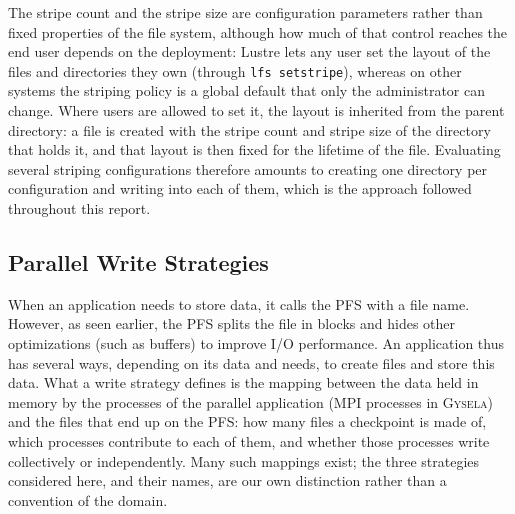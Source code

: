 The stripe count and the stripe size are configuration parameters rather than
fixed properties of the file system, although how much of that control reaches the
end user depends on the deployment: Lustre lets any user set the layout of the files
and directories they own (through \texttt{lfs setstripe}), whereas on other systems
the striping policy is a global default that only the administrator can change.
Where users are allowed to set it, the layout is inherited from the parent directory:
a file is created with the stripe count and stripe size of the directory that holds
it, and that layout is then fixed for the lifetime of the file. Evaluating several
striping configurations therefore amounts to creating one directory per configuration
and writing into each of them, which is the approach followed throughout this report.

\subsection{Parallel Write Strategies}
\label{sec:strategies}

When an application needs to store data, it calls the PFS with a file name. However,
as seen earlier, the PFS splits the file in blocks and hides other optimizations
(such as buffers) to improve I/O performance. An application thus has several ways,
depending on its data and needs, to create files and store this data. What a write
strategy defines is the mapping between the data held in memory by the processes of the
parallel application (MPI processes in \textsc{Gysela}) and the files that end up on the PFS: how many files a checkpoint is made of, which processes
contribute to each of them, and whether those processes write collectively or
independently. Many such mappings exist; the three strategies considered here, and
their names, are our own distinction rather than a convention of the domain.

